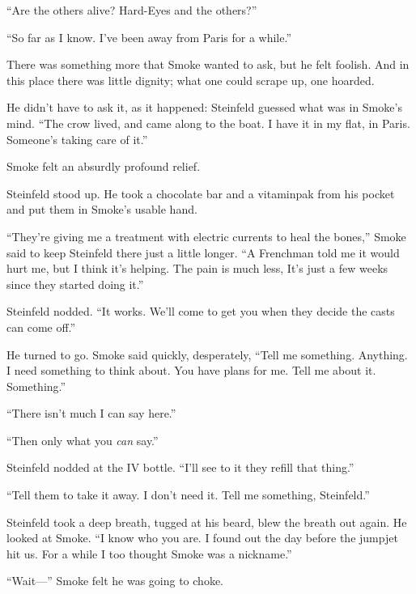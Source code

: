 ``Are the others alive? Hard-Eyes and the others?''

``So far as I know. I've been away from Paris for a while.''

There was something more that Smoke wanted to ask, but he felt foolish. And in this place there was little dignity; what one could scrape up, one hoarded.

He didn't have to ask it, as it happened: Steinfeld guessed what was in Smoke's mind. ``The crow lived, and came along to the boat. I have it in my flat, in Paris. Someone's taking care of it.''

Smoke felt an absurdly profound relief.

Steinfeld stood up. He took a chocolate bar and a vitaminpak from his pocket and put them in Smoke's usable hand.

``They're giving me a treatment with electric currents to heal the bones,'' Smoke said to keep Steinfeld there just a little longer. ``A Frenchman told me it would hurt me, but I think it's helping. The pain is much less, It's just a few weeks since they started doing it.''

Steinfeld nodded. ``It works. We'll come to get you when they decide the casts can come off.''

He turned to go. Smoke said quickly, desperately, ``Tell me something. Anything. I need something to think about. You have plans for me. Tell me about it. Something.''

``There isn't much I can say here.''

``Then only what you \textit{can} say.''

Steinfeld nodded at the IV bottle. ``I'll see to it they refill that thing.''

``Tell them to take it away. I don't need it. Tell me something, Steinfeld.''

Steinfeld took a deep breath, tugged at his beard, blew the breath out again. He looked at Smoke. ``I know who you are. I found out the day before the jumpjet hit us. For a while I too thought Smoke was a nickname.''

``Wait---'' Smoke felt he was going to choke.

